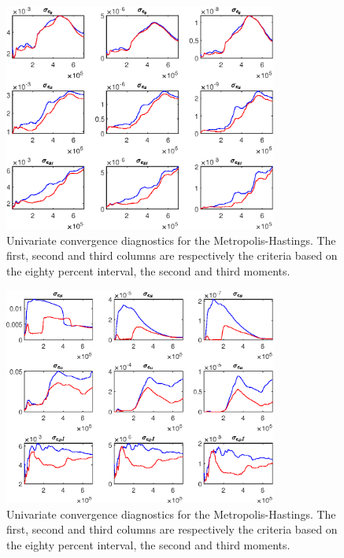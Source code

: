  
\begin{figure}[H]
\centering 
\includegraphics[width=0.80\textwidth]{BRS_sectoral/Output/BRS_sectoral_udiag1}
\caption{Univariate convergence diagnostics for the Metropolis-Hastings.
The first, second and third columns are respectively the criteria based on
the eighty percent interval, the second and third moments.}\label{Fig:UnivariateDiagnostics:1}
\end{figure}

\begin{figure}[H]
\centering 
\includegraphics[width=0.80\textwidth]{BRS_sectoral/Output/BRS_sectoral_udiag2}
\caption{Univariate convergence diagnostics for the Metropolis-Hastings.
The first, second and third columns are respectively the criteria based on
the eighty percent interval, the second and third moments.}\label{Fig:UnivariateDiagnostics:2}
\end{figure}

